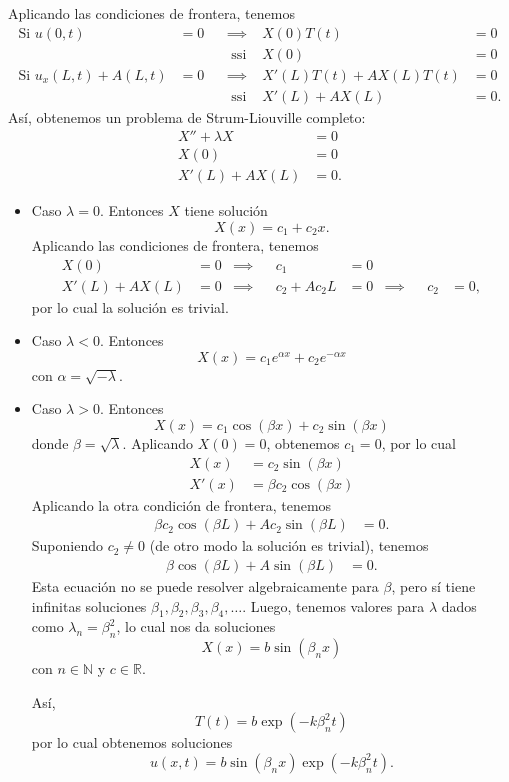 \documentclass[11pt,letterpaper]{report}
\newcommand\R{\mathbb R}
\newcommand\N{\mathbb N}
\newcommand\<{\langle}
\renewcommand\>{\rangle}
\begin{document}
Aplicando las condiciones de frontera, tenemos
\begin{align*}
  \text{Si } u(0,t)&=0
  & &\implies &
  X(0)T(t)&=0 \\
  && &\text{ ssi } &
  X(0)&=0 \\
  \text{Si } u_x(L,t)+A(L,t)&=0
  & &\implies &
  X'(L)T(t)+AX(L)T(t)&=0 \\
  && &\text{ ssi } &
  X'(L)+AX(L)&=0.
\end{align*}
Así, obtenemos un problema de Strum-Liouville completo:
\begin{align*}
  X''+\lambda X &= 0 \\
  X(0) &= 0 \\
  X'(L) + AX(L) &= 0.
\end{align*}
\begin{itemize}
  \item Caso $\lambda=0$.
  Entonces $X$ tiene solución
  \[
    X(x) = c_1 + c_2x
  .\]
  Aplicando las condiciones de frontera, tenemos
  \begin{align*}
    X(0)&=0
    &\implies &&
    c_1&=0
    \\
    X'(L)+AX(L)&=0
    &\implies &&
    c_2+Ac_2L&=0
    &\implies &&
    c_2 &= 0,
  \end{align*}
  por lo cual la solución es trivial.

  \item Caso $\lambda<0$.
  Entonces
  \[
    X(x) = c_1e^{\alpha x} + c_2e^{-\alpha x}
  \]
  con $\alpha=\sqrt{-\lambda}$.

  \item Caso $\lambda>0$.
  Entonces
  \[
    X(x) = c_1\cos(\beta x) + c_2\sin(\beta x)
  \]
  donde $\beta = \sqrt\lambda$.
  Aplicando $X(0)=0$, obtenemos $c_1=0$, por lo cual
  \begin{align*}
    X(x) &= c_2\sin(\beta x) \\
    X'(x) &= \beta c_2\cos(\beta x)
  \end{align*}
  Aplicando la otra condición de frontera, tenemos
  \begin{align*}
    \beta c_2\cos(\beta L)+Ac_2\sin(\beta L) &= 0.
  \end{align*}
  Suponiendo $c_2\neq 0$ (de otro modo la solución es trivial),
  tenemos
  \begin{align*}
    \beta\cos(\beta L)+A\sin(\beta L) &= 0.
  \end{align*}
  Esta ecuación no se puede resolver algebraicamente para
  $\beta$, pero sí tiene infinitas soluciones
  $\beta_1,\beta_2,\beta_3,\beta_4,\dots$.
  Luego, tenemos valores para $\lambda$ dados como
  $\lambda_n=\beta_n^2$, lo cual nos da soluciones
  \[
    X(x) = b\sin(\beta_n x)
  \]
  con $n\in\N$ y $c\in\R$.

  Así,
  \[
    T(t) = b\exp(-k\beta_n^2 t)
  \]
  por lo cual obtenemos soluciones
  \[
    u(x,t)
    =b\sin(\beta_n x)\exp(-k\beta_n^2 t)
  .\]
\end{itemize}
\end{document}
